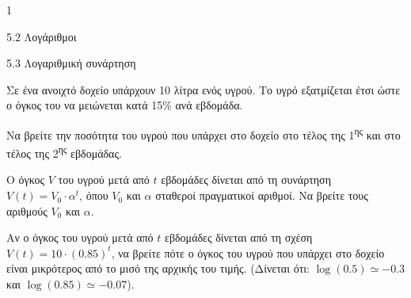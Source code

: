 \begin{ylh}{1}
\item 5.2 Λογάριθμοι
\item 5.3 Λογαριθμική συνάρτηση
\end{ylh}
Σε ένα ανοιχτό δοχείο υπάρχουν 10 λίτρα ενός υγρού. Το υγρό εξατμίζεται έτσι ώστε ο όγκος του να μειώνεται κατά 15\% ανά εβδομάδα.
\begin{alist}
\item Να βρείτε την ποσότητα του υγρού που υπάρχει στο δοχείο στο τέλος της 1\textsuperscript{ης} και στο τέλος της 2\textsuperscript{ης} εβδομάδας.
\item Ο όγκος $V$ του υγρού μετά από $t$ εβδομάδες δίνεται από τη συνάρτηση $V(t) = V_0 \cdot \alpha^t$, όπου $V_0$ και $\alpha$ σταθεροί πραγματικοί αριθμοί. Να βρείτε τους αριθμούς $V_0$ και $\alpha$.
\item Αν ο όγκος του υγρού μετά από $t$ εβδομάδες δίνεται από τη σχέση $V(t) = 10 \cdot (0.85)^t$, να βρείτε πότε ο όγκος του υγρού που υπάρχει στο δοχείο είναι μικρότερος από το μισό της αρχικής του τιμής. (Δίνεται ότι: $\log(0.5) \simeq -0.3$ και $\log(0.85) \simeq -0.07$).
\end{alist}

